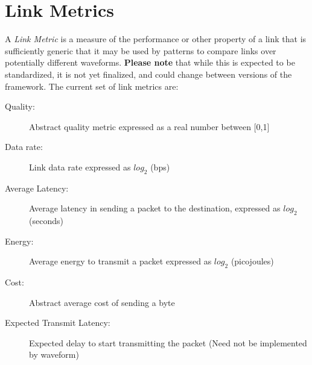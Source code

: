 \section{Link Metrics}
\label{Sec:Metrics}

A \emph{Link Metric} is a measure of the performance or other property
of a link that is sufficiently generic that it may be used by
patterns to compare links over potentially
different waveforms.  \textbf{Please note} that while this is expected to be
standardized, it is not yet finalized, and could change between
versions of the framework.
The current set of link metrics are:
\begin{description}
	\item [Quality:] Abstract quality metric expressed as a real number between [0,1]
	\item [Data rate:] Link data rate expressed as $log_2$ (bps)


	\item [Average Latency:] Average latency in sending a packet
          to the destination, expressed as $log_2$ (seconds)

	\item [Energy:] Average energy to transmit a packet expressed
          as $log_2$ (picojoules) 
	\item [Cost:] Abstract average cost of sending a byte
	\item[Expected Transmit Latency:] Expected delay to start transmitting the packet (Need not be implemented by waveform)
\end{description}



